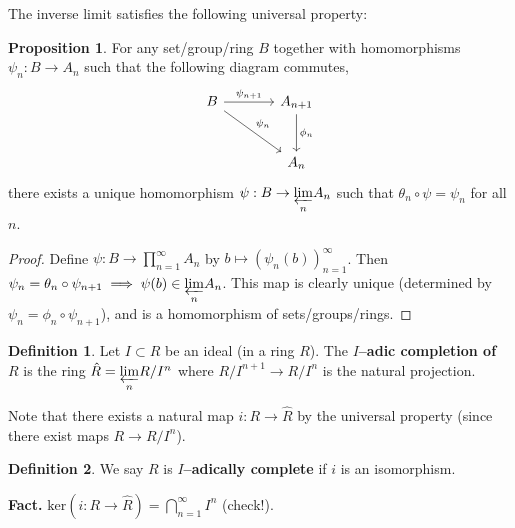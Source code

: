 \documentclass{article}
\theoremstyle{definition}
\newtheorem{prop}[theorem]{Proposition}
\newtheorem{defn}{Definition}[section]
\begin{document}
The inverse limit satisfies the following universal property:
\begin{prop}
    For any set/group/ring $B$ together with homomorphisms $\psi_n : B \to A_n$ such that the following diagram commutes,
    \[\begin{tikzcd}[row sep=large,column sep=large]
        B & A_{n+1} \\
        & A_n
        \arrow["\psi_{n+1}", from=1-1, to=1-2]
        \arrow["\psi_n", from=1-1, to=2-2]
        \arrow["\phi_n", from=1-2, to=2-2]
    \end{tikzcd}\]
    there exists a unique homomorphism $\psi : B \to \underset{n}{\varprojlim} A_n$ such that $\theta_n \circ \psi = \psi_n$ for all $n$.
\end{prop} 
\begin{proof}
    Define $\psi : B \to \prod_{n=1}^{\infty} A_n$ by $b \mapsto (\psi_n(b))_{n=1}^{\infty}$. Then $\psi_n = \theta_n \circ \psi_{n+1} \implies \psi(b) \in \underset{n}{\varprojlim} A_n$. This map is clearly unique (determined by $\psi_n = \phi_n \circ \psi_{n+1}$), and is a homomorphism of sets/groups/rings.
\end{proof}
\begin{defn}
    Let $I \subset R$ be an ideal (in a ring $R$). The \textbf{$I$--adic completion of $R$} is the ring $\hat{R} = \underset{n}{\varprojlim} R/I^n$ where $R/I^{n+1} \to R/I^n$ is the natural projection.
\end{defn}
Note that there exists a natural map $i : R \to \hat{R}$ by the universal property (since there exist maps $R \to R/I^n$).
\begin{defn}
    We say $R$ is \textbf{$I$--adically complete} if $i$ is an isomorphism.
\end{defn}
\textbf{Fact.} $\text{ker}(i : R \to \hat{R}) = \bigcap_{n=1}^{\infty} I^n$ (check!). 
\vspace{1mm}
 
\end{document}
